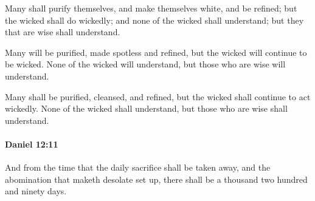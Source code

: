 			\begin{versebox}
					\item[BHS] 
					\item[LXX] 
					\item[ASV] Many shall purify themselves, and make themselves white, and be refined; but the wicked shall do wickedly; and none of the wicked shall understand; but they that are wise shall understand.
					\item[NIV] Many will be purified, made spotless and refined, but the wicked will continue to be wicked. None of the wicked will understand, but those who are wise will understand.
					\item[NRSV] Many shall be purified, cleansed, and refined, but the wicked shall continue to act wickedly. None of the wicked shall understand, but those who are wise shall understand.
			\end{versebox}

		\paragraph{Daniel 12:11} %
			\label{DANIEL-12-11}

			And from the time that the daily sacrifice shall be taken away, and the abomination that maketh desolate set up, there shall be a thousand two hundred and ninety days.

